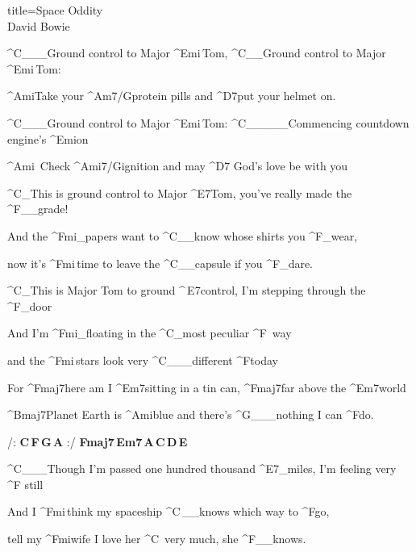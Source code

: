\begin{song}{title=\predtitle\centering Space Oddity \\\large David Bowie  \vspace*{-0.3cm}}  %
\begin{centerjustified}
\normalsize

\sloka 
	^{C{\color{white}\_\_\_}}Ground control to Major ^{Emi\,}Tom, ^{C{\color{white}\_\_}}Ground control to Major ^{Emi\,}Tom:

	^{Ami}Take your ^{Am7/G}protein pills and ^{D7}put your helmet on.

	^{C{\color{white}\_\_\_}}Ground control to Major ^{Emi\,}Tom:  ^{C{\color{white}\_\_\_\_\_}}Commencing countdown engine's ^{Emi}on

	^{Ami\,\,\,}Check ^{Ami7/G}ignition and may ^{D7\,\,}God's love be with you

	^{C{\color{white}\_}}This is ground control to Major ^{E7}Tom, you've really made the ^{F{\color{white}\_\_}}grade!

	And the ^{Fmi{\color{white}\_}}papers want to ^{C}{\color{white}\_\_}know whose shirts you ^{F{\color{white}\_}}wear, 

	now it's ^{Fmi\,}time to leave the ^{C{\color{white}\_\_}}capsule if you ^{F{\color{white}\_}}dare.

	^{C{\color{white}\_}}This is Major Tom to ground ^{\,E7}control, I'm stepping through the ^{F{\color{white}\_}}door

	And I'm ^{Fmi{\color{white}\_}}floating in the ^{C{\color{white}\_}}most peculiar ^{F\,\,\,}way 

	and the ^{Fmi\,}stars look very ^{C{\color{white}\_\_\_}}different ^{F}today
       
	For ^{Fmaj7}here am I ^{Em7}sitting in a tin can, ^{Fmaj7}far above the ^{Em7}world

	^{Bmaj7}Planet Earth is ^{Ami}blue and there's ^{G{\color{white}\_\_\_}}nothing I can ^{F}do.
	
	\phantom{.}

/: \textbf{C\,F\,G\,A} :/ \textbf{Fmaj7\,Em7\,A\,C\,D\,E}

 
\sloka
	^{C{\color{white}\_\_\_}}Though I'm passed one hundred thousand ^{E7{\color{white}\_}}miles, I'm feeling very ^{F\,\,}still

	And I ^{Fmi\,}think my spaceship ^{C\,{\color{white}\_\_}}knows which way to ^{F}go, 

	tell my ^{Fmi}wife I love her ^{C\,\,\,}very much, she ^{F{\color{white}\_\_}}knows.


\end{centerjustified}
\end{song}
